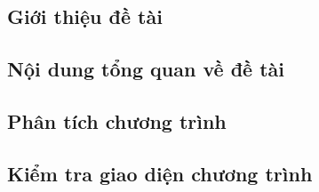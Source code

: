 \subsection{Giới thiệu đề tài}


\subsection{Nội dung tổng quan về đề tài}


\subsection{Phân tích chương trình}


\subsection{Kiểm tra giao diện chương trình}
